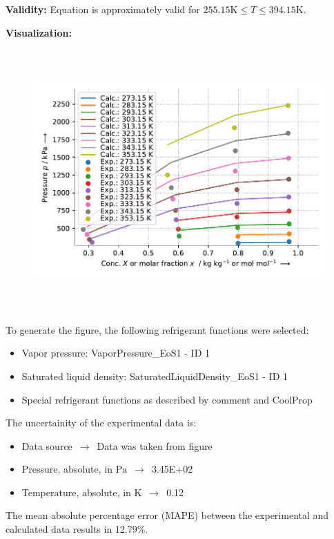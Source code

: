 \textbf{Validity:}
\newline
Equation is approximately valid for $255.15 \si{\kelvin} \leq T \leq 394.15 \si{\kelvin}$.
\newline

\textbf{Visualization:}
%
\begin{figure}[!htp]
{\noindent\includegraphics[height=10cm, keepaspectratio]{figs/abs/abs_R-12_paraffinic__TsubokaKatayama_1.pdf}}
\end{figure}
%

To generate the figure, the following refrigerant functions were selected:
\begin{itemize}
\item Vapor pressure: VaporPressure\_EoS1 - ID 1
\item Saturated liquid density: SaturatedLiquidDensity\_EoS1 - ID 1
\item Special refrigerant functions as described by comment and CoolProp
\end{itemize}

The uncertainity of the experimental data is:
\begin{itemize}
\item Data source $\,\to\,$ Data was taken from figure
\item Pressure, absolute, in $\si{\pascal}$ $\,\to\,$ 3.45E+02
\item Temperature, absolute, in $\si{\kelvin}$ $\,\to\,$ 0.12
\end{itemize}

The mean absolute percentage error (MAPE) between the experimental and calculated data results in 12.79\%.
\FloatBarrier
\newpage
